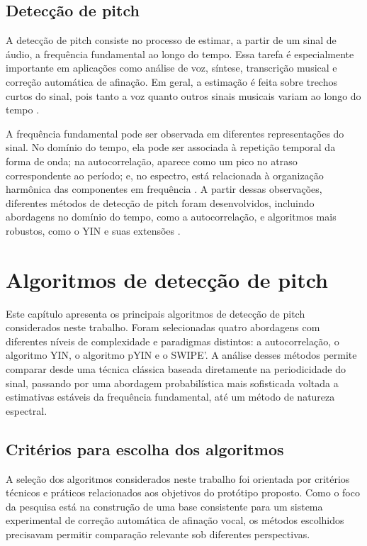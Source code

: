 \section{Detecção de pitch}

A detecção de pitch consiste no processo de estimar, a partir de um sinal de áudio, a frequência fundamental ao longo do tempo. Essa tarefa é especialmente importante em aplicações como análise de voz, síntese, transcrição musical e correção automática de afinação. Em geral, a estimação é feita sobre trechos curtos do sinal, pois tanto a voz quanto outros sinais musicais variam ao longo do tempo \cite{aalto_f0_estimation,decheveigne2002yin}.

A frequência fundamental pode ser observada em diferentes representações do sinal. No domínio do tempo, ela pode ser associada à repetição temporal da forma de onda; na autocorrelação, aparece como um pico no atraso correspondente ao período; e, no espectro, está relacionada à organização harmônica das componentes em frequência \cite{aalto_f0_estimation}. A partir dessas observações, diferentes métodos de detecção de pitch foram desenvolvidos, incluindo abordagens no domínio do tempo, como a autocorrelação, e algoritmos mais robustos, como o YIN e suas extensões \cite{decheveigne2002yin}.

\chapter{\label{chap:algoritmos_pitch}Algoritmos de detecção de pitch}

Este capítulo apresenta os principais algoritmos de detecção de pitch considerados neste trabalho. Foram selecionadas quatro abordagens com diferentes níveis de complexidade e paradigmas distintos: a autocorrelação, o algoritmo YIN, o algoritmo pYIN e o SWIPE'. A análise desses métodos permite comparar desde uma técnica clássica baseada diretamente na periodicidade do sinal, passando por uma abordagem probabilística mais sofisticada voltada a estimativas estáveis da frequência fundamental, até um método de natureza espectral.

\section{Critérios para escolha dos algoritmos}

A seleção dos algoritmos considerados neste trabalho foi orientada por critérios técnicos e práticos relacionados aos objetivos do protótipo proposto. Como o foco da pesquisa está na construção de uma base consistente para um sistema experimental de correção automática de afinação vocal, os métodos escolhidos precisavam permitir comparação relevante sob diferentes perspectivas.

